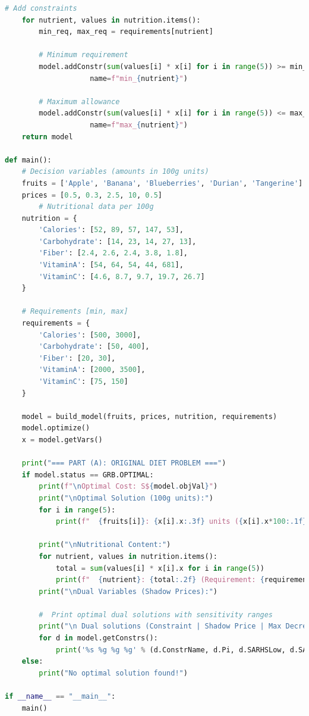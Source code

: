 \documentclass[12pt]{article}
\begin{document}
\begin{enumerate}[label= (\alph*), leftmargin=2em]
\begin{lstlisting}[language=Python, caption={Investment Optimization Python Code}]
    # Add constraints
    for nutrient, values in nutrition.items():
        min_req, max_req = requirements[nutrient]
        
        # Minimum requirement
        model.addConstr(sum(values[i] * x[i] for i in range(5)) >= min_req, 
                    name=f"min_{nutrient}")
        
        # Maximum allowance
        model.addConstr(sum(values[i] * x[i] for i in range(5)) <= max_req, 
                    name=f"max_{nutrient}")
    return model

def main():
    # Decision variables (amounts in 100g units)
    fruits = ['Apple', 'Banana', 'Blueberries', 'Durian', 'Tangerine']
    prices = [0.5, 0.3, 2.5, 10, 0.5]
        # Nutritional data per 100g
    nutrition = {
        'Calories': [52, 89, 57, 147, 53],
        'Carbohydrate': [14, 23, 14, 27, 13],
        'Fiber': [2.4, 2.6, 2.4, 3.8, 1.8],
        'VitaminA': [54, 64, 54, 44, 681],
        'VitaminC': [4.6, 8.7, 9.7, 19.7, 26.7]
    }

    # Requirements [min, max]
    requirements = {
        'Calories': [500, 3000],
        'Carbohydrate': [50, 400],
        'Fiber': [20, 30],
        'VitaminA': [2000, 3500],
        'VitaminC': [75, 150]
    }

    model = build_model(fruits, prices, nutrition, requirements)
    model.optimize()
    x = model.getVars()

    print("=== PART (A): ORIGINAL DIET PROBLEM ===")
    if model.status == GRB.OPTIMAL:
        print(f"\nOptimal Cost: S${model.objVal}")
        print("\nOptimal Solution (100g units):")
        for i in range(5):
            print(f"  {fruits[i]}: {x[i].x:.3f} units ({x[i].x*100:.1f}g)")
        
        print("\nNutritional Content:")
        for nutrient, values in nutrition.items():
            total = sum(values[i] * x[i].x for i in range(5))
            print(f"  {nutrient}: {total:.2f} (Requirement: {requirements[nutrient][0]} - {requirements[nutrient][1]})")
        print("\nDual Variables (Shadow Prices):")
        
        #  Print optimal dual solutions with sensitivity ranges
        print("\n Dual solutions (Constraint | Shadow Price | Max Decrease | Max Increase):")
        for d in model.getConstrs():
            print('%s %g %g %g' % (d.ConstrName, d.Pi, d.SARHSLow, d.SARHSUp))
    else:
        print("No optimal solution found!")

if __name__ == "__main__":
    main()


\end{lstlisting}
\end{enumerate}
\end{document}
